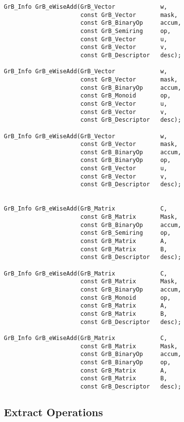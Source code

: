 \documentclass[11pt]{article}
\begin{document}
\begin{verbatim}
GrB_Info GrB_eWiseAdd(GrB_Vector             w,
                      const GrB_Vector       mask,
                      const GrB_BinaryOp     accum,
                      const GrB_Semiring     op,
                      const GrB_Vector       u,
                      const GrB_Vector       v,
                      const GrB_Descriptor   desc);
                            
GrB_Info GrB_eWiseAdd(GrB_Vector             w,
                      const GrB_Vector       mask,
                      const GrB_BinaryOp     accum,
                      const GrB_Monoid       op,
                      const GrB_Vector       u,
                      const GrB_Vector       v,
                      const GrB_Descriptor   desc);

GrB_Info GrB_eWiseAdd(GrB_Vector             w,
                      const GrB_Vector       mask,
                      const GrB_BinaryOp     accum,
                      const GrB_BinaryOp     op,
                      const GrB_Vector       u,
                      const GrB_Vector       v,
                      const GrB_Descriptor   desc);


GrB_Info GrB_eWiseAdd(GrB_Matrix             C,
                      const GrB_Matrix       Mask,
                      const GrB_BinaryOp     accum,
                      const GrB_Semiring     op, 
                      const GrB_Matrix       A,
                      const GrB_Matrix       B,
                      const GrB_Descriptor   desc);

GrB_Info GrB_eWiseAdd(GrB_Matrix             C,
                      const GrB_Matrix       Mask,
                      const GrB_BinaryOp     accum,
                      const GrB_Monoid       op, 
                      const GrB_Matrix       A,
                      const GrB_Matrix       B,
                      const GrB_Descriptor   desc);

GrB_Info GrB_eWiseAdd(GrB_Matrix             C,
                      const GrB_Matrix       Mask,
                      const GrB_BinaryOp     accum,
                      const GrB_BinaryOp     op, 
                      const GrB_Matrix       A,
                      const GrB_Matrix       B,
                      const GrB_Descriptor   desc);
\end{verbatim}

\subsection{Extract Operations}
\end{document}
